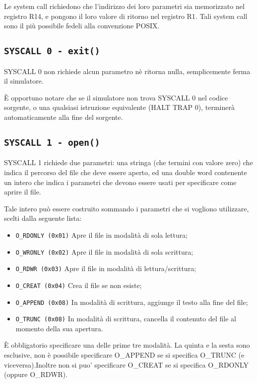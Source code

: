 \documentclass[12pt]{report}
\begin{document}
Le system call richiedono che l'indirizzo dei loro parametri sia memorizzato nel registro R14, 
e pongono il loro valore di ritorno nel registro R1.
Tali system call sono il pi\`{u} possibile fedeli alla convenzione POSIX.

\subsection{\texttt{SYSCALL 0 - exit()}}
SYSCALL 0 non richiede alcun parametro n\`{e} ritorna nulla, semplicemente ferma il simulatore.

\`{E} opportuno notare che se il simulatore non trova SYSCALL 0 nel codice sorgente, 
o una qualsiasi istruzione equivalente (HALT  TRAP 0), terminer\`{a} automaticamente alla fine del sorgente.

\subsection{\texttt{SYSCALL 1 - open()}}
SYSCALL 1 richiede due parametri: una stringa (che termini con valore zero) che indica il percorso del file 
che deve essere aperto, ed una double word contenente un intero che indica i parametri che devono 
essere usati per specificare come aprire il file.

Tale intero pu\`{o} essere costruito sommando i parametri che si vogliono utilizzare, scelti dalla seguente lista:
\begin{itemize}
	\item \texttt{O\_RDONLY (0x01)} Apre il file in modalit\`{a} di sola lettura;
	\item \texttt{O\_WRONLY (0x02)} Apre il file in modalit\`{a} di sola scrittura;
	\item \texttt{O\_RDWR (0x03)} Apre il file in modalit\`{a} di lettura/scrittura;
	\item \texttt{O\_CREAT (0x04)} Crea il file se non esiste;
	\item \texttt{O\_APPEND (0x08)} In modalit\`{a} di scrittura, aggiunge il testo alla fine del file;
	\item \texttt{O\_TRUNC (0x08)} In modalit\`{a} di scrittura, cancella il contenuto del file al momento della sua apertura.
\end{itemize}

\`{E} obbligatorio specificare una delle prime tre modalit\`{a}. La quinta e la sesta sono esclusive, 
non \`{e} possibile specificare O\_APPEND se si specifica O\_TRUNC (e viceversa).Inoltre non si puo' specificare O\_CREAT 
se si specifica O\_RDONLY (oppure O\_RDWR).
\end{document}
